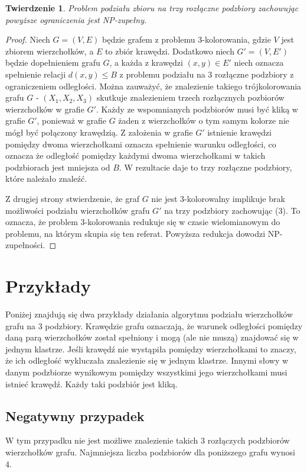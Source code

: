 \documentclass[10pt,a4paper]{article}
\newtheorem{theorem}{Twierdzenie}
\begin{document}
\begin{theorem}
Problem podziału zbioru na trzy rozłączne podzbiory zachowując powyższe ograniczenia jest NP-zupełny.
\end{theorem}
\begin{proof}
Niech $G = (V, E)$ będzie grafem z problemu 3-kolorowania, gdzie $V$ jest zbiorem wierzchołków, a $E$ to zbiór krawędzi.
Dodatkowo niech $G' = (V, E')$ będzie dopełnieniem grafu $G$, a każda z krawędzi $(x, y) \in E'$ niech oznacza
spełnienie relacji $d(x, y) \leq B$ z problemu podziału na 3 rozłączne podzbiory z ograniczeniem odległości.
Można zauważyć, że znalezienie takiego trójkolorowania grafu $G$ - $(X_1, X_2, X_3)$ skutkuje znalezieniem
trzech rozłącznych pozbiorów wierzchołków w grafie $G'$. Każdy ze wspomnianych podzbiorów musi być kliką w grafie $G'$,
ponieważ w grafie $G$ żaden z wierzchołków o tym samym kolorze nie mógł być połączony krawędzią. Z założenia w grafie $G'$
istnienie krawędzi pomiędzy dwoma wierzchołkami oznacza spełnienie warunku odległości, co oznacza że odległość
pomiędzy każdymi dwoma wierzchołkami w takich podzbiorach jest mniejsza od $B$. W rezultacie daje to trzy
rozłączne podzbiory, które należało znaleźć.
\par
Z drugiej strony stwierdzenie, że graf $G$ nie jest 3-kolorowalny implikuje brak możliwości podziału wierzchołków
grafu $G'$ na trzy podzbiory zachowując (3). To oznacza, że problem 3-kolorowania redukuje się
w czasie wielomianowym do problemu, na którym skupia się ten referat. Powyższa redukcja dowodzi NP-zupełności.
\end{proof}

\section{Przykłady}
\par
Poniżej znajdują się dwa przykłady działania algorytmu podziału wierzchołków grafu na 3 podzbiory. Krawędzie grafu
oznaczają, że warunek odległości pomiędzy daną parą wierzchołków został spełniony i mogą (ale nie muszą)
znajdować się w jednym klastrze. Jeśli krawędź nie wystąpiła pomiędzy wierzchołkami to znaczy, że ich odległość
wykluczała znalezienie się w jednym klastrze. Innymi słowy w danym podzbiorze wynikowym pomiędzy wszystkimi jego
wierzchołkami musi istnieć krawędź. Każdy taki podzbiór jest kliką.

\subsection{Negatywny przypadek}\label{sec:negatywny}
\par
W tym przypadku nie jest możliwe znalezienie takich 3 rozłączych podzbiorów wierzchołków grafu.
Najmniejsza liczba podzbiorów dla poniższego grafu wynosi 4.
\end{document}
